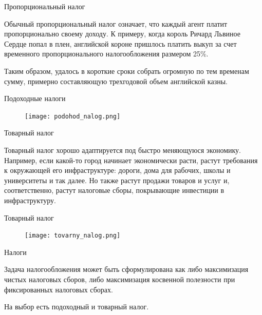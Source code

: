 \documentclass{beamer}
\begin{document}
\begin{frame}{Пропорциональный налог}

Обычный пропорциональный налог означает, что каждый агент платит пропорционально своему доходу. К примеру, когда король Ричард Львиное Сердце попал в плен, английской короне пришлось платить выкуп за счет временного пропорционального налогообложения размером 25\%. 

Таким образом, удалось в короткие сроки собрать огромную по тем временам сумму, примерно составляющую трехгодовой объем английской казны.

\end{frame}

\begin{frame}{Подоходные налоги}

\begin{figure}[hbt]
\centering
\texttt{[image: podohod\_nalog.png]}
\end{figure}

\end{frame}

\begin{frame}{Товарный налог}

Товарный налог хорошо адаптируется под быстро меняющуюся экономику. Например, если какой-то город начинает экономически расти, растут требования к окружающей его инфраструктуре: дороги, дома для рабочих, школы и университеты и так далее. Но также растут продажи товаров и услуг и, соответственно, растут налоговые сборы, покрывающие инвестиции в инфраструктуру.

\end{frame}

\begin{frame}{Товарный налог}

\begin{figure}[hbt]
\centering
\texttt{[image: tovarny\_nalog.png]}
\end{figure}

\end{frame}

\begin{frame}{Налоги}

Задача налогообложения может быть сформулирована как либо максимизация чистых налоговых сборов, либо максимизация косвенной полезности при фиксированных налоговых сборах. 

На выбор есть подоходный и товарный налог.

\end{frame}
\end{document}
